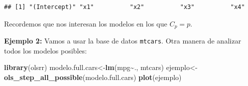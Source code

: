 \documentclass[
]{book}
\newenvironment{Shaded}{\begin{snugshade}}{\end{snugshade}}
\newcommand{\CommentTok}[1]{\textcolor[rgb]{0.56,0.35,0.01}{\textit{#1}}}
\newcommand{\FunctionTok}[1]{\textcolor[rgb]{0.13,0.29,0.53}{\textbf{#1}}}
\newcommand{\NormalTok}[1]{#1}
\newcommand{\OtherTok}[1]{\textcolor[rgb]{0.56,0.35,0.01}{#1}}
\newcommand{\SpecialCharTok}[1]{\textcolor[rgb]{0.81,0.36,0.00}{\textbf{#1}}}
\begin{document}
\begin{Shaded}
\end{Shaded}

\begin{verbatim}
## [1] "(Intercept)" "x1"          "x2"          "x3"          "x4"
\end{verbatim}

Recordemos que nos interesan los modelos en los que \(C_p=p\).

\textbf{Ejemplo 2:} Vamos a usar la base de datos \texttt{mtcars}. Otra manera de analizar todos los modelos posibles:

\begin{Shaded}
\begin{Highlighting}[]
\FunctionTok{library}\NormalTok{(olsrr)}
\NormalTok{modelo.full.cars}\OtherTok{\textless{}{-}}\FunctionTok{lm}\NormalTok{(mpg}\SpecialCharTok{\textasciitilde{}}\NormalTok{., mtcars)}
\NormalTok{ejemplo}\OtherTok{\textless{}{-}}\FunctionTok{ols\_step\_all\_possible}\NormalTok{(modelo.full.cars)}
\FunctionTok{plot}\NormalTok{(ejemplo)}
\end{Highlighting}
\end{Shaded}
\end{document}
